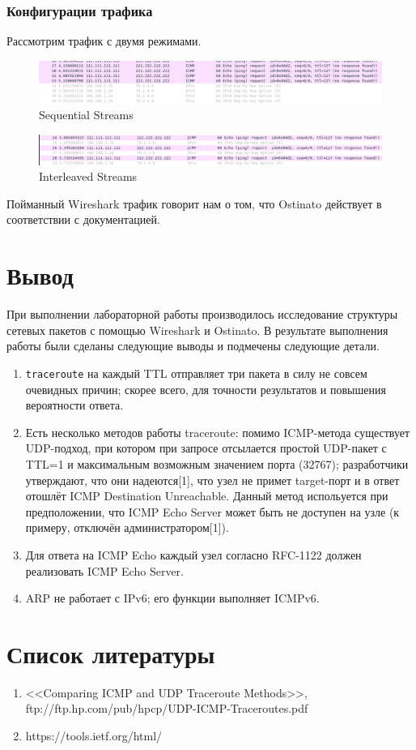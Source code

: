 \documentclass[12pt, a4paper] {ncc}
\begin{document}
\subsubsection*{Конфигурации трафика}
	Рассмотрим трафик с двумя режимами.
	\begin{figure}[h!]
		\includegraphics[scale=0.4]{SeqB.png}
		\caption{Sequential Streams}
		\center
	\end{figure}

	\begin{figure}[h!]
		\includegraphics[scale=0.4]{InterleavedB.png}
		\caption{Interleaved Streams}
		\center
	\end{figure}

	Пойманный Wireshark трафик говорит нам о том, что Ostinato действует в соответствии с
	документацией.

\section*{Вывод}

При выполнении лабораторной работы производилось исследование структуры сетевых пакетов с помощью Wireshark и Ostinato.
В результате выполнения работы были сделаны следующие выводы и подмечены следующие детали. 
\begin{enumerate}
	\item \texttt{traceroute} на каждый TTL отправляет три пакета в силу не совсем очевидных причин;
		  скорее всего, для точности результатов и повышения вероятности ответа.
	\item Есть несколько методов работы traceroute: помимо ICMP-метода существует UDP-подход, при котором
		  при запросе отсылается простой UDP-пакет с TTL=1 и максимальным возможным значением порта (32767);
		  разработчики утверждают, что они надеются[1], что узел не примет target-порт и в ответ отошлёт
		  ICMP Destination Unreachable. Данный метод испольуется при предположении, что ICMP Echo Server
		  может быть не доступен на узле (к примеру, отключён администратором[1]).
	\item Для ответа на ICMP Echo каждый узел согласно RFC-1122 должен реализовать ICMP Echo Server.
	\item ARP не работает с IPv6; его функции выполняет ICMPv6.
\end{enumerate}

\section*{Список литературы}
\begin{enumerate}
	\item <<Comparing ICMP and  UDP Traceroute Methods>>, ftp://ftp.hp.com/pub/hpcp/UDP-ICMP-Traceroutes.pdf
	\item https://tools.ietf.org/html/
\end{enumerate}
\end{document}
